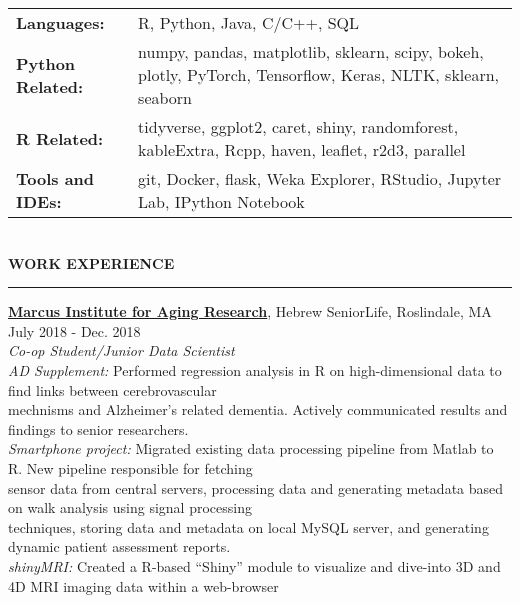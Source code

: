 \documentclass[a4paper]{article}
\newcommand{\myline}{\par
  \kern2pt %
  \hrule height 0.5pt
  \kern2pt %
}
\newcommand{\mybullet}{
	\indent \textbullet \hspace*{2mm}
}
\newcommand{\linetab}{
  \\ \hspace*{9mm}
}
\begin{document}
	\noindent
	\begin{tabular}{ m{3cm} l }
		\textbf{Languages: } & R, Python, Java, C/C++, SQL \\ 
    \textbf{Python Related: } & numpy, pandas, matplotlib, sklearn, scipy, bokeh, plotly, PyTorch, 
    Tensorflow, Keras, NLTK, sklearn, seaborn \\ 
    \textbf{R Related: } & tidyverse, ggplot2, caret, shiny, randomforest, kableExtra, Rcpp, 
    haven, leaflet, r2d3, parallel \\
		\textbf{Tools and IDEs: } & git, Docker, flask, Weka Explorer, RStudio, 
                Jupyter Lab, IPython Notebook\\
	\end{tabular} \\

	\smallskip
	\smallskip
	\noindent
	{\large \textbf{WORK EXPERIENCE}}
	\myline 
	\smallskip
	
  \noindent
  \textbf{\href{https://www.marcusinstituteforaging.org/}{Marcus Institute for Aging Research}}, 
  Hebrew SeniorLife, Roslindale, MA 
  \hfill July 2018 - Dec. 2018 \\
        \textit{Co-op Student/Junior Data Scientist} \\
        \mybullet \textit{AD Supplement:} Performed regression analysis in R on high-dimensional 
        data to find links between cerebrovascular  \\ \hspace*{9mm} mechnisms 
        and Alzheimer's related dementia. Actively communicated results and findings to senior
        researchers. \\
        \mybullet \textit{Smartphone project:} Migrated existing data processing pipeline from 
        Matlab to R. New pipeline responsible for fetching \linetab sensor data from 
        central servers, processing data and generating metadata based on walk analysis 
        using signal processing \linetab techniques, storing data and metadata on local 
        MySQL server, and generating dynamic patient assessment reports. \\
        \mybullet \textit{shinyMRI: } Created a R-based ``Shiny'' module to visualize and 
        dive-into 3D and 4D MRI imaging data within a web-browser \\
        
	
\end{document}
